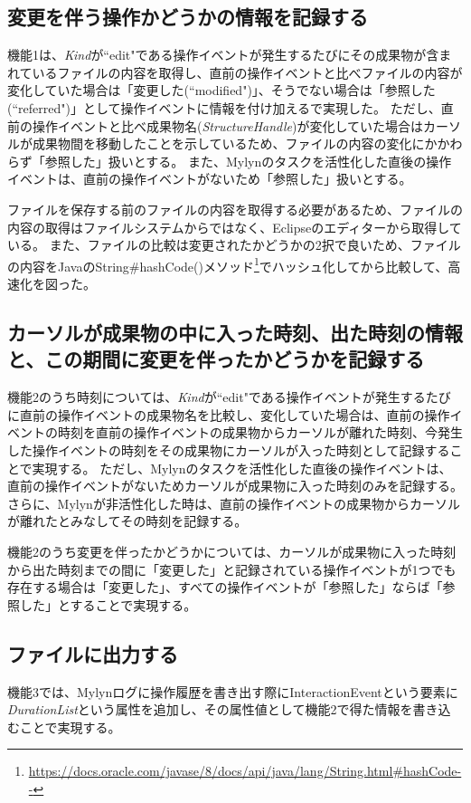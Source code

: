 \documentclass[a4paper]{jsbook}
\begin{document}
\subsection{変更を伴う操作かどうかの情報を記録する}
機能1は、{\it Kind}が``edit"である操作イベントが発生するたびにその成果物が含まれているファイルの内容を取得し、直前の操作イベントと比べファイルの内容が変化していた場合は「変更した(``modified")」、そうでない場合は「参照した(``referred")」として操作イベントに情報を付け加えるで実現した。
ただし、直前の操作イベントと比べ成果物名({\it StructureHandle})が変化していた場合はカーソルが成果物間を移動したことを示しているため、ファイルの内容の変化にかかわらず「参照した」扱いとする。
また、Mylynのタスクを活性化した直後の操作イベントは、直前の操作イベントがないため「参照した」扱いとする。

ファイルを保存する前のファイルの内容を取得する必要があるため、ファイルの内容の取得はファイルシステムからではなく、Eclipseのエディターから取得している。
また、ファイルの比較は変更されたかどうかの2択で良いため、ファイルの内容をJavaのString\#hashCode()メソッド\footnote{\url{https://docs.oracle.com/javase/8/docs/api/java/lang/String.html\#hashCode--}}でハッシュ化してから比較して、高速化を図った。

\subsection{カーソルが成果物の中に入った時刻、出た時刻の情報と、この期間に変更を伴ったかどうかを記録する}
機能2のうち時刻については、{\it Kind}が``edit"である操作イベントが発生するたびに直前の操作イベントの成果物名を比較し、変化していた場合は、直前の操作イベントの時刻を直前の操作イベントの成果物からカーソルが離れた時刻、今発生した操作イベントの時刻をその成果物にカーソルが入った時刻として記録することで実現する。
ただし、Mylynのタスクを活性化した直後の操作イベントは、直前の操作イベントがないためカーソルが成果物に入った時刻のみを記録する。
さらに、Mylynが非活性化した時は、直前の操作イベントの成果物からカーソルが離れたとみなしてその時刻を記録する。

機能2のうち変更を伴ったかどうかについては、カーソルが成果物に入った時刻から出た時刻までの間に「変更した」と記録されている操作イベントが1つでも存在する場合は「変更した」、すべての操作イベントが「参照した」ならば「参照した」とすることで実現する。

\subsection{ファイルに出力する}
機能3では、Mylynログに操作履歴を書き出す際にInteractionEventという要素に{\it DurationList}という属性を追加し、その属性値として機能2で得た情報を書き込むことで実現する。
\end{document}
